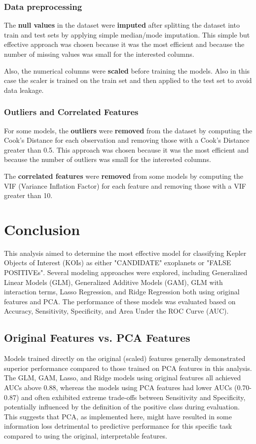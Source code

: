 \subsection{Data preprocessing}
The \textbf{null values} in the dataset were \textbf{imputed} after splitting the dataset into train and test sets by applying simple median/mode imputation. This simple but effective approach was chosen because it was the most efficient and because the number of missing values was small for the interested columns.

Also, the numerical columns were \textbf{scaled} before training the models. Also in this case the scaler is trained on the train set and then applied to the test set to avoid data leakage.

\subsection{Outliers and Correlated Features}
For some models, the \textbf{outliers} were \textbf{removed} from the dataset by computing the Cook's Distance for each observation and removing those with a Cook's Distance greater than 0.5. This approach was chosen because it was the most efficient and because the number of outliers was small for the interested columns.

The \textbf{correlated features} were \textbf{removed} from some models by computing the VIF (Variance Inflation Factor) for each feature and removing those with a VIF greater than 10.

\chapter{Conclusion}
This analysis aimed to determine the most effective model for classifying Kepler Objects of Interest (KOIs) as either "CANDIDATE" exoplanets or "FALSE POSITIVEs". Several modeling approaches were explored, including Generalized Linear Models (GLM), Generalized Additive Models (GAM), GLM with interaction terms, Lasso Regression, and Ridge Regression both using original features and PCA. The performance of these models was evaluated based on Accuracy, Sensitivity, Specificity, and Area Under the ROC Curve (AUC).

\section{Original Features vs. PCA Features}
Models trained directly on the original (scaled) features generally demonstrated superior performance compared to those trained on PCA features in this analysis. The GLM, GAM, Lasso, and Ridge models using original features all achieved AUCs above 0.88, whereas the models using PCA features had lower AUCs (0.70-0.87) and often exhibited extreme trade-offs between Sensitivity and Specificity, potentially influenced by the definition of the positive class during evaluation. This suggests that PCA, as implemented here, might have resulted in some information loss detrimental to predictive performance for this specific task compared to using the original, interpretable features.

